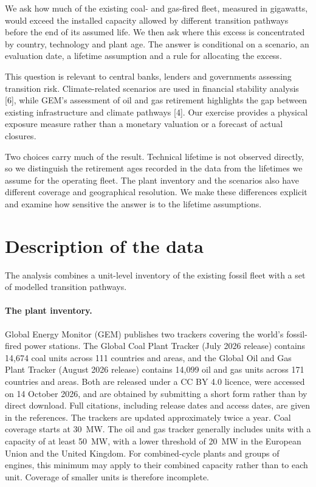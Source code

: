 \documentclass[11pt,a4paper]{article}
\begin{document}
We ask how much of the existing coal- and gas-fired fleet, measured in gigawatts, would exceed the installed capacity allowed by different transition pathways before the end of its assumed life. We then ask where this excess is concentrated by country, technology and plant age. The answer is conditional on a scenario, an evaluation date, a lifetime assumption and a rule for allocating the excess.

This question is relevant to central banks, lenders and governments assessing transition risk. Climate-related scenarios are used in financial stability analysis {[}6{]}, while GEM's assessment of oil and gas retirement highlights the gap between existing infrastructure and climate pathways {[}4{]}. Our exercise provides a physical exposure measure rather than a monetary valuation or a forecast of actual closures.

Two choices carry much of the result. Technical lifetime is not observed directly, so we distinguish the retirement ages recorded in the data from the lifetimes we assume for the operating fleet. The plant inventory and the scenarios also have different coverage and geographical resolution. We make these differences explicit and examine how sensitive the answer is to the lifetime assumptions.

\section{Description of the data}

The analysis combines a unit-level inventory of the existing fossil fleet with a set of modelled transition pathways.

\paragraph{The plant inventory.}

Global Energy Monitor (GEM) publishes two trackers covering the world's fossil-fired power stations. The Global Coal Plant Tracker (July 2026 release) contains 14,674 coal units across 111 countries and areas, and the Global Oil and Gas Plant Tracker (August 2026 release) contains 14,099 oil and gas units across 171 countries and areas. Both are released under a CC BY 4.0 licence, were accessed on 14 October 2026, and are obtained by submitting a short form rather than by direct download. Full citations, including release dates and access dates, are given in the references. The trackers are updated approximately twice a year. Coal coverage starts at 30~MW. The oil and gas tracker generally includes units with a capacity of at least 50~MW, with a lower threshold of 20~MW in the European Union and the United Kingdom. For combined-cycle plants and groups of engines, this minimum may apply to their combined capacity rather than to each unit. Coverage of smaller units is therefore incomplete.
\end{document}

